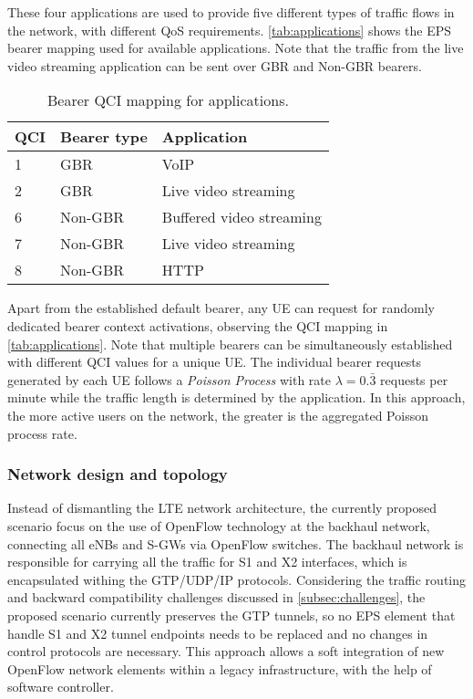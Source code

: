These four applications are used to provide five different types of traffic
flows in the network, with different \ac{QoS} requirements.
\autoref{tab:applications} shows the \ac{EPS} bearer mapping used for available
applications. Note that the traffic from the live video streaming application
can be sent over \ac{GBR} and Non-\ac{GBR} bearers.

\begin{table}[b!]
  \caption{Bearer \acs{QCI} mapping for applications.}
  \label{tab:applications}
  \centering
  \begin{tabular}{lll}
    \toprule
    \bfseries \acs{QCI} & \bfseries Bearer type & \bfseries Application \\
    \midrule
    1 & \ac{GBR}     & \ac{VoIP} \\
    2 & \ac{GBR}     & Live video streaming \\
    6 & Non-\ac{GBR} & Buffered video streaming \\
    7 & Non-\ac{GBR} & Live video streaming \\
    8 & Non-\ac{GBR} & \ac{HTTP} \\
    \bottomrule
  \end{tabular}
\end{table}

Apart from the established default bearer, any \ac{UE} can request for randomly
dedicated bearer context activations, observing the \ac{QCI} mapping in
\autoref{tab:applications}. Note that multiple bearers can be simultaneously
established with different \ac{QCI} values for a unique \ac{UE}. The individual
bearer requests generated by each \ac{UE} follows a \emph{Poisson Process} with
rate $\lambda = 0.\bar{3}$ requests per minute while the traffic length is
determined by the application. In this approach, the more active users on the
network, the greater is the aggregated Poisson process rate.

\subsubsection{Network design and topology}
\label{subsec:design}

Instead of dismantling the \ac{LTE} network architecture, the currently
proposed scenario focus on the use of OpenFlow technology at the backhaul
network, connecting all \acp{eNB} and \acp{S-GW} via OpenFlow switches. The
backhaul network is responsible for carrying all the traffic for S1 and X2
interfaces, which is encapsulated withing the \ac{GTP}/\ac{UDP}/\ac{IP}
protocols. Considering the traffic routing and backward compatibility
challenges discussed in \autoref{subsec:challenges}, the proposed scenario
currently preserves the \ac{GTP} tunnels, so no \ac{EPS} element that handle S1
and X2 tunnel endpoints needs to be replaced and no changes in control
protocols are necessary. This approach allows a soft integration of new
OpenFlow network elements within a legacy infrastructure, with the help of
software controller.

